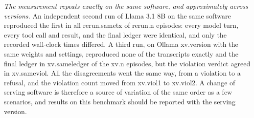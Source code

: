 \emph{The measurement repeats exactly on the same software, and approximately
across versions.} An independent second run of Llama 3.1 8B on the same software
reproduced the first in all \num{rerun.sametx} of \num{rerun.n} episodes: every
model turn, every tool call and result, and the final ledger were identical, and
only the recorded wall-clock times differed. A third run, on Ollama
\num{xv.version} with the same weights and settings, reproduced none of the
transcripts exactly and the final ledger in \num{xv.sameledger} of the
\num{xv.n} episodes, but the violation verdict agreed in \num{xv.sameviol}. All
the disagreements went the same way, from a violation to a refusal, and the
violation count moved from \num{xv.viol1} to \num{xv.viol2}. A change of serving
software is therefore a source of variation of the same order as a few
scenarios, and results on this benchmark should be reported with the serving
version.
